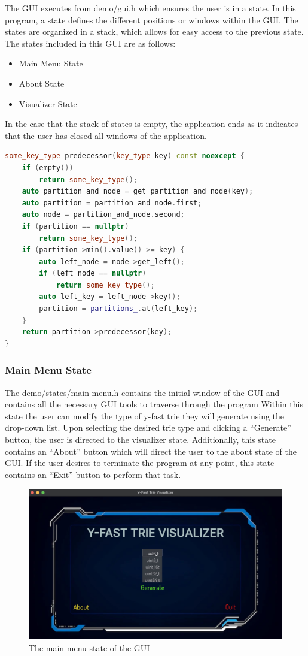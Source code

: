 \documentclass{article}
\begin{document}
\noindent
The GUI executes from demo/gui.h which ensures the user is in a state. In this program, a state defines the different positions or windows within the GUI. The states are organized in a stack, which allows for easy access to the previous state. The states included in this GUI are as follows:

\begin{itemize}
    \item Main Menu State
    \item About State
    \item Visualizer State
\end{itemize}

\noindent
In the case that the stack of states is empty, the application ends as it indicates that the user has closed all windows of the application.

\begin{lstlisting}[language=C++,basicstyle=\small]
some_key_type predecessor(key_type key) const noexcept {
	if (empty()) 
	    return some_key_type();
	auto partition_and_node = get_partition_and_node(key);
	auto partition = partition_and_node.first;
	auto node = partition_and_node.second;
	if (partition == nullptr) 
	    return some_key_type();
	if (partition->min().value() >= key) {
		auto left_node = node->get_left();
		if (left_node == nullptr) 
		    return some_key_type();
		auto left_key = left_node->key();
		partition = partitions_.at(left_key);
	}
	return partition->predecessor(key);
}
\end{lstlisting}

\subsubsection{Main Menu State}
The demo/states/main-menu.h contains the initial window of the GUI and contains all the necessary GUI tools to traverse through the program  Within this state the user can modify the type of y-fast trie they will generate using the drop-down list. Upon selecting the desired trie type and clicking a “Generate” button, the user is directed to the visualizer state. Additionally, this state contains an “About” button which will direct the user to the about state of the GUI. If the user desires to terminate the program at any point, this state contains an “Exit” button to perform that task.

\begin{figure}[h]
    \centering
    \includegraphics[width = 12cm]{mainmenu.png}
    \caption{The main menu state of the GUI}
\end{figure}
\end{document}
